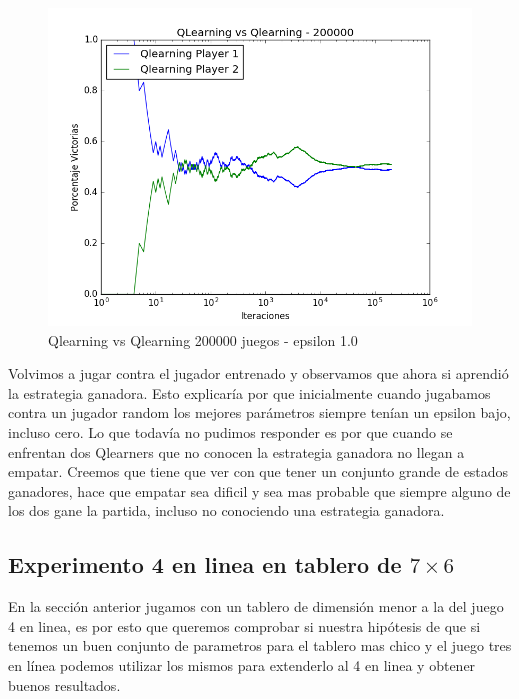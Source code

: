 \begin{figure}[H]
 \centering
 \begin{minipage}{.45\textwidth}
	\centering
	\includegraphics[scale=0.35]{img1/QlearningVsQlearning_200000_6x5_merge_e0p1.png}
        \caption{Qlearning vs Qlearning 200000 juegos - epsilon 1.0}
  \end{minipage}
\end{figure}


Volvimos a jugar contra el jugador entrenado y observamos que ahora si aprendió la estrategia ganadora. Esto explicaría por que inicialmente cuando jugabamos contra un jugador random los mejores parámetros siempre tenían un epsilon bajo, incluso cero.
Lo que todavía no pudimos responder es por que cuando se enfrentan dos Qlearners que no conocen la estrategia ganadora no llegan a empatar. Creemos que tiene que ver con que tener un conjunto grande de estados ganadores, hace que empatar sea dificil y sea mas probable que siempre alguno de los dos gane la partida, incluso no conociendo una estrategia ganadora.\\



\subsection{Experimento 4 en linea en tablero de $7\times6$}
En la sección anterior jugamos con un tablero de dimensión menor a la del juego 4 en linea, es por esto que queremos comprobar si nuestra hipótesis de que si tenemos un buen conjunto de parametros para el tablero mas chico y el juego tres en línea podemos utilizar los mismos para extenderlo al 4 en linea y obtener buenos resultados.

